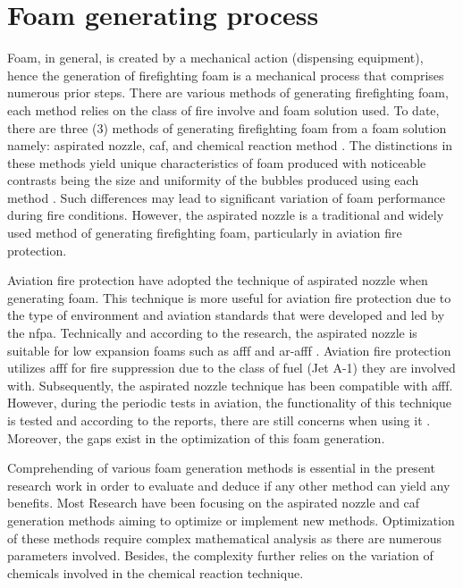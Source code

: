 \section{Foam generating process}
Foam, in general, is created by a mechanical action (dispensing equipment), hence the generation of firefighting foam is a mechanical process that comprises numerous prior steps. There are various methods of generating firefighting foam, each method relies on the class of fire involve and foam solution used. To date, there are three (3) methods of generating firefighting foam from a foam solution namely: aspirated nozzle, \acrfull{caf}, and chemical reaction method \cite{laundess2012suppression}. The distinctions in these methods yield unique characteristics of foam produced with noticeable contrasts being the size and uniformity of the bubbles produced using each method \cite{laundess2012suppression}. Such differences may lead to significant variation of foam performance during fire conditions. However, the aspirated nozzle is a traditional and widely used method of generating firefighting foam, particularly in aviation fire protection.

Aviation fire protection have adopted the technique of aspirated nozzle when generating foam. This technique is more useful for aviation fire protection due to the type of environment and aviation standards that were developed and led by the \acrfull{nfpa}. Technically and according to the research, the aspirated nozzle is suitable for low expansion foams such as \acrshort{afff} and \acrshort{ar-afff} \cite{xi2017experimental}.  Aviation fire protection utilizes \acrshort{afff} for fire suppression due to the class of fuel (Jet A-1) they are involved with. Subsequently, the aspirated nozzle technique has been compatible with \acrshort{afff}. However, during the periodic tests in aviation, the functionality of this technique is tested and according to the reports, there are still concerns when using it \cite{laundess2012suppression}. Moreover, the gaps exist in the optimization of this foam generation.

Comprehending of various foam generation methods is essential in the present research work in order to evaluate and deduce if any other method can yield any benefits. Most Research have been focusing on the aspirated nozzle and \acrshort{caf} generation methods aiming to optimize or implement new methods. Optimization of these methods require complex mathematical analysis as there are numerous parameters involved. Besides, the complexity further relies on the variation of chemicals involved in the chemical reaction technique.

